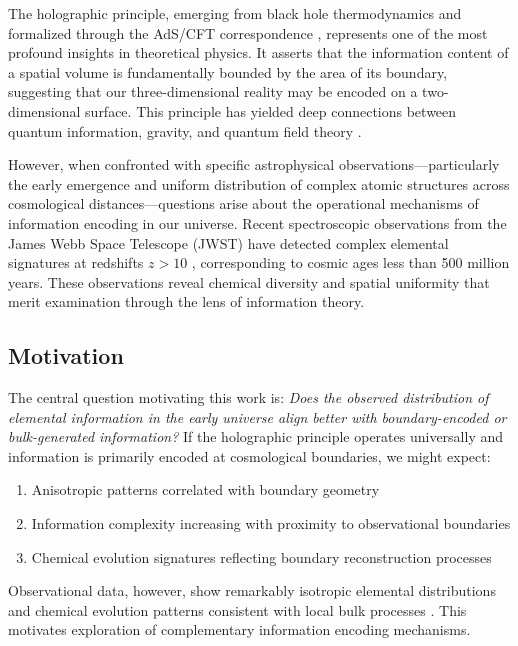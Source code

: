 \documentclass[twocolumn,aps,prd,superscriptaddress,nofootinbib]{revtex4-2}
\begin{document}
The holographic principle, emerging from black hole thermodynamics and formalized through the AdS/CFT correspondence \cite{tHooft1993, Susskind1995, Maldacena1999}, represents one of the most profound insights in theoretical physics. It asserts that the information content of a spatial volume is fundamentally bounded by the area of its boundary, suggesting that our three-dimensional reality may be encoded on a two-dimensional surface. This principle has yielded deep connections between quantum information, gravity, and quantum field theory \cite{Bousso2002}.

However, when confronted with specific astrophysical observations—particularly the early emergence and uniform distribution of complex atomic structures across cosmological distances—questions arise about the operational mechanisms of information encoding in our universe. Recent spectroscopic observations from the James Webb Space Telescope (JWST) have detected complex elemental signatures at redshifts $z > 10$ \cite{Robertson2023, Curtis-Lake2023}, corresponding to cosmic ages less than 500 million years. These observations reveal chemical diversity and spatial uniformity that merit examination through the lens of information theory.

\subsection{Motivation}

The central question motivating this work is: \textit{Does the observed distribution of elemental information in the early universe align better with boundary-encoded or bulk-generated information?} If the holographic principle operates universally and information is primarily encoded at cosmological boundaries, we might expect:

\begin{enumerate}
    \item Anisotropic patterns correlated with boundary geometry
    \item Information complexity increasing with proximity to observational boundaries
    \item Chemical evolution signatures reflecting boundary reconstruction processes
\end{enumerate}

Observational data, however, show remarkably isotropic elemental distributions and chemical evolution patterns consistent with local bulk processes \cite{Madau2014, Springel2018}. This motivates exploration of complementary information encoding mechanisms.
\end{document}

